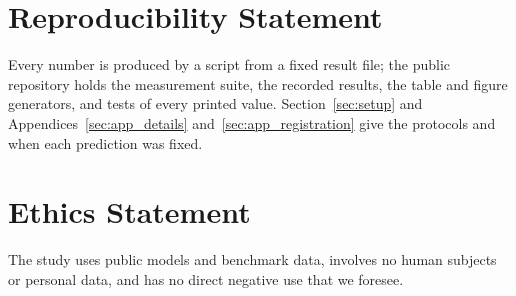 \section*{Reproducibility Statement}
Every number is produced by a script from a fixed result file; the public repository holds the
measurement suite, the recorded results, the table and figure generators, and tests of every printed
value. Section~\ref{sec:setup} and Appendices~\ref{sec:app_details} and~\ref{sec:app_registration} give
the protocols and when each prediction was fixed.

\section*{Ethics Statement}
The study uses public models and benchmark data, involves no human subjects or personal data, and has
no direct negative use that we foresee.
